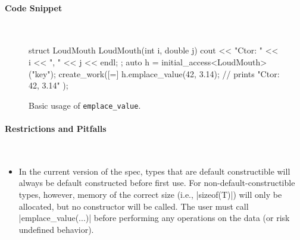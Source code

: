 \paragraph{Code Snippet}\mbox{}\\ 
\begin{figure}[!h]
\begin{CppCodeNumb}
struct LoudMouth {
  LoudMouth(int i, double j) { cout << "Ctor: " << i << ", " << j << endl; }
};
auto h = initial_access<LoudMouth>("key");
create_work([=]{
  h.emplace_value(42, 3.14); // prints "Ctor: 42, 3.14" 
});
\end{CppCodeNumb}
\label{fig:fe_api_initialaccess}
\caption{Basic usage of \lstinline|emplace_value|.}
\end{figure}

\paragraph{Restrictions and Pitfalls}\mbox{}\\ 
\begin{itemize}
  \item In the current version of the spec, types that are default constructible
  will always be default constructed before first use.  For
  non-default-constructible types, however, memory of the correct size (i.e.,
  |sizeof(T)|) will only be allocated, but no constructor will be called.  The 
  user must call |emplace_value(...)| before performing any operations on the data (or risk undefined behavior).
\end{itemize}




